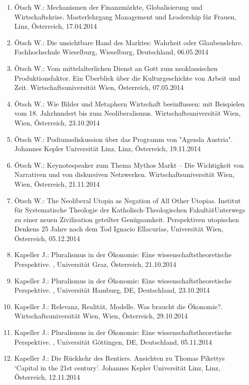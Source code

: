 \begin{enumerate}
	\item Ötsch W.: Mechanismen der Finanzmärkte, Globalisierung und Wirtschaftskrise. Masterlehrgang Management und Leadership für Frauen, Linz, Österreich, 17.04.2014
	\item Ötsch W.: Die unsichtbare Hand des Marktes: Wahrheit oder Glaubenslehre. Fachhochschule Wieselburg, Wieselburg, Deutschland, 06.05.2014
	\item Ötsch W.: Vom mittelalterlichen Dienst an Gott zum neoklassischen Produktionsfaktor. Ein Überblick über die Kulturgeschichte von Arbeit und Zeit. Wirtschaftsuniversität Wien, Österreich, 07.05.2014
	\item Ötsch W.: Wie Bilder und Metaphern Wirtschaft beeinflussen: mit Beispielen vom 18. Jahrhundert bis zum Neoliberalismus. Wirtschaftsuniversität Wien, Wien, Österreich, 23.10.2014
	\item Ötsch W.: Podiumsdiskussion über das Programm von "Agenda Austria". Johannes Kepler Universität Linz, Linz, Österreich, 19.11.2014
	\item Ötsch W.: Keynotespeaker zum Thema Mythos Markt – Die Wichtigkeit von Narrativen und von diskursiven Netzwerken. Wirtschaftsuniversität Wien, Wien, Österreich, 21.11.2014
	\item Ötsch W.: The Neoliberal Utopia as Negation of All Other Utopias. Institut für Systematische Theologie der Katholisch-Theologischen FakultätUnterwegs zu einer neuen Zivilisation geteilter Genügsamkeit. Perspektiven utopischen Denkens 25 Jahre nach dem Tod Ignacio Ellacurías, Universität Wien, Österreich, 05.12.2014
	\item Kapeller J.: Pluralismus in der Ökonomie: Eine wissenschaftstheoretische Perspektive. , Universität Graz, Österreich, 21.10.2014
	\item Kapeller J.: Pluralismus in der Ökonomie: Eine wissenschaftstheoretische Perspektive. , Universität Hamburg, DE, Deutschland, 23.10.2014
	\item Kapeller J.: Relevanz, Realität, Modelle. Was braucht die Ökonomie?. Wirtschaftsuniversität Wien, Wien, Österreich, 29.10.2014
	\item Kapeller J.: Pluralismus in der Ökonomie: Eine wissenschaftstheoretische Perspektive. , Universität Göttingen, DE, Deutschland, 05.11.2014
	\item Kapeller J.: Die Rückkehr des Rentiers. Ansichten zu Thomas Pikettys ‘Capital in the 21st century’. Johannes Kepler Universität Linz, Linz, Österreich, 12.11.2014

\end{enumerate}
